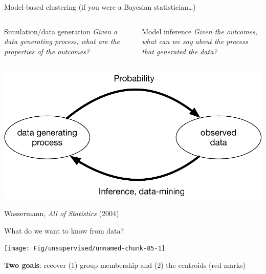 \documentclass[
  ignorenonframetext,
  aspectratio=169]{beamer}
\begin{document}
\begin{frame}{Model-based clustering (if you were a Bayesian
statistician\ldots)}
\protect\hypertarget{model-based-clustering-if-you-were-a-bayesian-statistician}{}
\begin{columns}[T]
\begin{column}{.45\textwidth}
\begin{block}{Simulation/data generation}
\protect\hypertarget{simulationdata-generation}{}
\emph{Given a data generating process, what are the properties of the
outcomes?}
\end{block}
\end{column}

\begin{column}{.45\textwidth}
\begin{block}{Model inference}
\protect\hypertarget{model-inference}{}
\emph{Given the outcomes, what can we say about the process that
generated the data?}
\end{block}
\end{column}
\end{columns}

\scriptsize

\begin{center}\includegraphics[width=.7\linewidth]{./Vis/unsupervised/model_based_inference} \end{center}

\normalsize

\tiny

Wassermann, \emph{All of Statistics} (2004)

\scriptsize

\normalsize
\end{frame}

\begin{frame}{What do we want to know from data?}
\protect\hypertarget{what-do-we-want-to-know-from-data}{}
\scriptsize

\begin{center}\texttt{[image: Fig/unsupervised/unnamed-chunk-85-1]} \end{center}

\normalsize

\textbf{Two goals}: recover (1) group membership and (2) the centroids
(red marks)
\end{frame}
\end{document}
